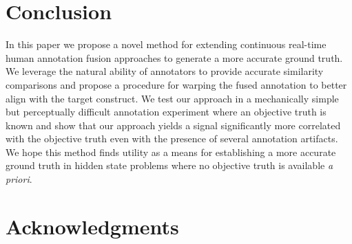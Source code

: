 \documentclass[10pt,letterpaper]{article}
\begin{document}
\section*{Conclusion}
In this paper we propose a novel method for extending continuous real-time human annotation fusion approaches to generate a more accurate ground truth.  We leverage the natural ability of annotators to provide accurate similarity comparisons and propose a procedure for warping the fused annotation to better align with the target construct.  We test our approach in a mechanically simple but perceptually difficult annotation experiment where an objective truth is known and show that our approach yields a signal significantly more correlated with the objective truth even with the presence of several annotation artifacts.  We hope this method finds utility as a means for establishing a more accurate ground truth in hidden state problems where no objective truth is available \textit{a priori}.

\section*{Acknowledgments}




\end{document}
